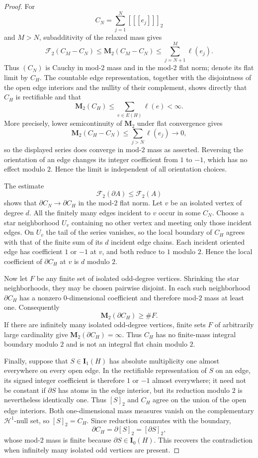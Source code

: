 \documentclass[11pt]{article}
\theoremstyle{remark}
\newcommand{\M}{\mathbf M}
\newcommand{\I}{\mathbf I}
\newcommand{\Hh}{\mathcal H}
\newcommand{\llbracket}{[\![}
\newcommand{\rrbracket}{]\!]}
\begin{document}
\begin{proof}
For
\[
       C_N=\sum_{j=1}^{N}[\llbracket e_j\rrbracket]_2
\]
and $M>N$, subadditivity of the relaxed mass gives
\[
 \mathcal F_2(C_M-C_N)
 \le \M_2(C_M-C_N)
 \le \sum_{j=N+1}^{M}\ell(e_j).
\]
Thus $(C_N)$ is Cauchy in mod-$2$ mass and in the mod-$2$ flat norm; denote
its flat limit by $C_H$. The countable edge representation, together with
the disjointness of the open edge interiors and the nullity of their
complement, shows directly that $C_H$ is rectifiable and that
\[
       \M_2(C_H)\le \sum_{e\in E(H)}\ell(e)<\infty.
\]
More precisely, lower semicontinuity of $\M_2$ under flat convergence gives
\[
       \M_2(C_H-C_N)
       \le \sum_{j>N}\ell(e_j)\longrightarrow0,
\]
so the displayed series does converge in mod-$2$ mass as asserted.
Reversing the orientation of an edge changes its integer coefficient from
$1$ to $-1$, which has no effect modulo $2$. Hence the limit is independent
of all orientation choices.

The estimate
\[
       \mathcal F_2(\partial A)\le \mathcal F_2(A)
\]
shows that $\partial C_N\to\partial C_H$ in the mod-$2$ flat norm. Let $v$
be an isolated vertex of degree $d$. All the finitely many edges incident to
$v$ occur in some $C_N$. Choose a star neighborhood $U_v$ containing no
other vertex and meeting only those incident edges. On $U_v$ the tail of the
series vanishes, so the local boundary of $C_H$ agrees with that of the
finite sum of its $d$ incident edge chains. Each incident oriented edge has
coefficient $1$ or $-1$ at $v$, and both reduce to $1$ modulo $2$. Hence the
local coefficient of $\partial C_H$ at $v$ is $d$ modulo $2$.

Now let $F$ be any finite set of isolated odd-degree vertices. Shrinking the
star neighborhoods, they may be chosen pairwise disjoint. In each such
neighborhood $\partial C_H$ has a nonzero $0$-dimensional coefficient and
therefore mod-$2$ mass at least one. Consequently
\[
       \M_2(\partial C_H)\ge \#F.
\]
If there are infinitely many isolated odd-degree vertices, finite sets $F$
of arbitrarily large cardinality give
$\M_2(\partial C_H)=\infty$. Thus $C_H$ has no finite-mass integral boundary
modulo $2$ and is not an integral flat chain modulo $2$.

Finally, suppose that $S\in\I_1(H)$ has absolute multiplicity one almost
everywhere on every open edge. In the rectifiable representation of $S$ on
an edge, its signed integer coefficient is therefore $1$ or $-1$ almost
everywhere; it need not be constant if $\partial S$ has atoms in the edge
interior, but its reduction modulo $2$ is nevertheless identically one.
Thus $[S]_2$ and $C_H$ agree on the union of the open edge interiors. Both
one-dimensional mass measures vanish on the complementary $\Hh^1$-null
set, so $[S]_2=C_H$. Since reduction commutes with the boundary,
\[
       \partial C_H=\partial[S]_2=[\partial S]_2,
\]
whose mod-$2$ mass is finite because $\partial S\in\I_0(H)$. This recovers
the contradiction when infinitely many isolated odd vertices are present.
\end{proof}
\end{document}
